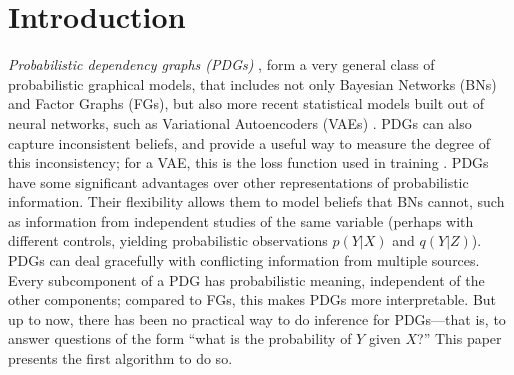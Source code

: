 \newcommand\zogamma{{\mathrlap{\raisebox{-0.1ex}{$\hat{\phantom{x}}$}}\gamma}}
\newif\ifvfull
    \vfulltrue %

\section{Introduction}

\emph{Probabilistic dependency graphs (PDGs)} \parencite{pdg-aaai},
form a very general class of probabilistic graphical models,
that includes not only
Bayesian Networks (BNs) and
Factor Graphs (FGs),
but also more recent statistical models built out of neural networks,
such as Variational Autoencoders (VAEs) \parencite{kingma2013autoencoding}.
\expandafter\discard{}%
\expandafter\discard{}%
\expandafter\discard{}%
\expandafter\discard{}%
%
PDGs can also capture inconsistent 
beliefs, and provide a useful way to measure the degree of this inconsistency;
for a VAE, this is the loss function used in training
    \parencite{one-true-loss}.
    PDGs have some
significant advantages over other representations of probabilistic information. 
    Their flexibility allows them to model beliefs that BNs cannot, 
such as information from independent studies of the same variable
(perhaps with different controls, yielding probabilistic observations $p(Y|X)$ and $q(Y|Z)$).
PDGs
can deal gracefully with conflicting information from multiple sources.
Every subcomponent of a PDG has probabilistic
    meaning, independent of the other components;
compared to FGs, this makes PDGs more interpretable.
But up to now, there has been no practical way to do inference for
PDGs---that is,
to answer questions of the form
``what is the probability of $Y$ given $X$?''
This paper presents the first algorithm to do so.



